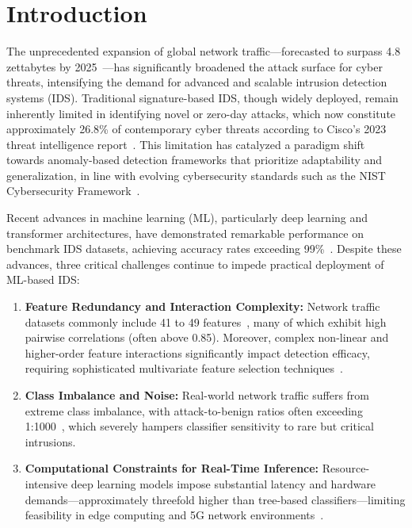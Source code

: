 \documentclass[conference]{IEEEtran}
\begin{document}
\section{Introduction}

The unprecedented expansion of global network traffic—forecasted to surpass 4.8 zettabytes by 2025~\cite{cisco}—has significantly broadened the attack surface for cyber threats, intensifying the demand for advanced and scalable intrusion detection systems (IDS). Traditional signature-based IDS, though widely deployed, remain inherently limited in identifying novel or zero-day attacks, which now constitute approximately 26.8\% of contemporary cyber threats according to Cisco's 2023 threat intelligence report~\cite{cisco}. This limitation has catalyzed a paradigm shift towards anomaly-based detection frameworks that prioritize adaptability and generalization, in line with evolving cybersecurity standards such as the NIST Cybersecurity Framework~\cite{nist_framework}.

Recent advances in machine learning (ML), particularly deep learning and transformer architectures, have demonstrated remarkable performance on benchmark IDS datasets, achieving accuracy rates exceeding 99\%~\cite{zhang}. Despite these advances, three critical challenges continue to impede practical deployment of ML-based IDS:

\begin{enumerate}
    \item \textbf{Feature Redundancy and Interaction Complexity:} Network traffic datasets commonly include 41 to 49 features~\cite{feature_survey}, many of which exhibit high pairwise correlations (often above 0.85). Moreover, complex non-linear and higher-order feature interactions significantly impact detection efficacy, requiring sophisticated multivariate feature selection techniques~\cite{urbanowicz}.
    \item \textbf{Class Imbalance and Noise:} Real-world network traffic suffers from extreme class imbalance, with attack-to-benign ratios often exceeding 1:1000~\cite{imbalance}, which severely hampers classifier sensitivity to rare but critical intrusions.
    \item \textbf{Computational Constraints for Real-Time Inference:} Resource-intensive deep learning models impose substantial latency and hardware demands—approximately threefold higher than tree-based classifiers—limiting feasibility in edge computing and 5G network environments~\cite{liu}.
\end{enumerate}
\end{document}
